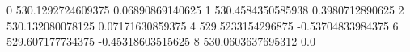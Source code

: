 0 530.1292724609375 0.06890869140625
1 530.4584350585938 0.3980712890625
2 530.132080078125 0.07171630859375
4 529.5233154296875 -0.53704833984375
6 529.607177734375 -0.45318603515625
8 530.0603637695312 0.0
